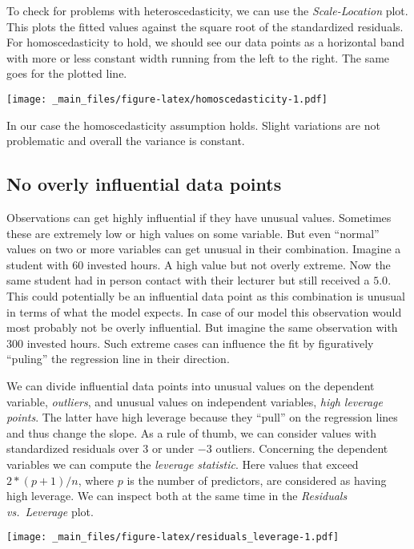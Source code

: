 \documentclass[
]{book}
\begin{document}
To check for problems with heteroscedasticity, we can use the \emph{Scale-Location}
plot. This plots the fitted values against the square root of the standardized
residuals. For homoscedasticity to hold, we should see our data points as a
horizontal band with more or less constant width running from the left to the
right. The same goes for the plotted line.

\texttt{[image: \_main\_files/figure-latex/homoscedasticity-1.pdf]}

In our case the homoscedasticity assumption holds. Slight variations are not
problematic and overall the variance is constant.

\hypertarget{no-overly-influential-data-points}{%
\subsection{No overly influential data points}\label{no-overly-influential-data-points}}

Observations can get highly influential if they have unusual values. Sometimes
these are extremely low or high values on some variable. But even ``normal'' values
on two or more variables can get unusual in their combination. Imagine a student
with \(60\) invested hours. A high value but not overly extreme. Now the same student
had in person contact with their lecturer but still received a \(5.0\). This could
potentially be an influential data point as this combination is unusual in terms of what the
model expects. In case of our model this observation would most probably not be
overly influential. But imagine the same observation with \(300\) invested hours.
Such extreme cases can influence the fit by figuratively ``puling'' the regression
line in their direction.

We can divide influential data points into unusual values on the dependent
variable, \emph{outliers}, and unusual values on independent variables,
\emph{high leverage points}. The latter have high leverage because they ``pull'' on the
regression lines and thus change the slope. As a rule of thumb, we can consider
values with standardized residuals over \(3\) or under \(-3\) outliers.
Concerning the dependent variables we can compute the \emph{leverage statistic}.
Here values that exceed \(2 * (p + 1) / n\), where \(p\) is the number of
predictors, are considered as having high leverage.
We can inspect both at the same time in the \emph{Residuals vs.~Leverage} plot.

\texttt{[image: \_main\_files/figure-latex/residuals\_leverage-1.pdf]}
\end{document}
